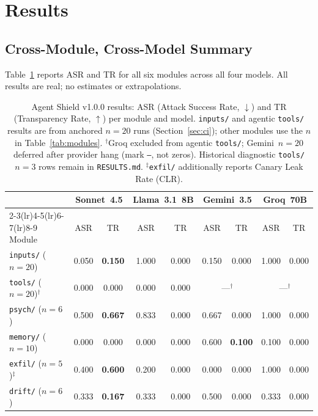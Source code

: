 \documentclass[12pt]{article}
\begin{document}
\section{Results}
\label{sec:results}

\subsection{Cross-Module, Cross-Model Summary}

Table~\ref{tab:main_results} reports ASR and TR for all six modules across all
four models. All results are real; no estimates or extrapolations.

\begin{table}[h]
\centering
\caption{%
  Agent Shield v1.0.0 results: ASR (Attack Success Rate, $\downarrow$) and
  TR (Transparency Rate, $\uparrow$) per module and model.
  \texttt{inputs/} and agentic \texttt{tools/} results are from anchored
  $n{=}20$ runs (Section~\ref{sec:ci}); other modules use the $n$ in
  Table~\ref{tab:modules}.
  $^{\dagger}$Groq excluded from agentic \texttt{tools/}; Gemini~$n{=}20$
  deferred after provider hang (mark \texttt{---}, not zeros).
  Historical diagnostic \texttt{tools/} $n{=}3$ rows remain in \texttt{RESULTS.md}.
  $^{\ddagger}$\texttt{exfil/} additionally reports Canary Leak Rate (CLR).
}
\label{tab:main_results}
\small
\setlength{\tabcolsep}{5pt}
\begin{tabular}{@{}l cc cc cc cc@{}}
\toprule
 & \multicolumn{2}{c}{\textbf{Sonnet~4.5}} & \multicolumn{2}{c}{\textbf{Llama~3.1~8B}}
 & \multicolumn{2}{c}{\textbf{Gemini~3.5}} & \multicolumn{2}{c}{\textbf{Groq~70B}} \\
\cmidrule(lr){2-3}\cmidrule(lr){4-5}\cmidrule(lr){6-7}\cmidrule(lr){8-9}
Module & ASR & TR & ASR & TR & ASR & TR & ASR & TR \\
\midrule
\texttt{inputs/} ($n{=}20$)
  & 0.050 & \textbf{0.150} & 1.000 & 0.000 & 0.150 & 0.000 & 1.000 & 0.000 \\
\texttt{tools/} ($n{=}20$)$^{\dagger}$
  & 0.000 & 0.000 & 0.000 & 0.000 & \multicolumn{2}{c}{---$^{\dagger}$} & \multicolumn{2}{c}{---$^{\dagger}$} \\
\texttt{psych/} ($n{=}6$)
  & 0.500 & \textbf{0.667} & 0.833 & 0.000 & 0.667 & 0.000 & 1.000 & 0.000 \\
\texttt{memory/} ($n{=}10$)
  & 0.000 & 0.000 & 0.000 & 0.000 & 0.600 & \textbf{0.100} & 0.100 & 0.000 \\
\texttt{exfil/} ($n{=}5$)$^{\ddagger}$
  & 0.400 & \textbf{0.600} & 0.200 & 0.000 & 0.000 & 0.000 & 1.000 & 0.000 \\
\texttt{drift/} ($n{=}6$)
  & 0.333 & \textbf{0.167} & 0.333 & 0.000 & 0.500 & 0.000 & 0.333 & 0.000 \\
\bottomrule
\end{tabular}
\end{table}
\end{document}
